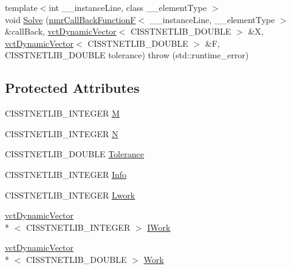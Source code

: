 {\bf }\par
\begin{DoxyCompactItemize}
\item 
{\footnotesize template$<$int \-\_\-\-\_\-instance\-Line, class \-\_\-\-\_\-element\-Type $>$ }\\void \hyperlink{classnmr_l_s_non_lin_solver_a79af0b924ff834cf31df5e20ae261c59}{Solve} (\hyperlink{classnmr_call_back_function_f}{nmr\-Call\-Back\-Function\-F}$<$ \-\_\-\-\_\-instance\-Line, \-\_\-\-\_\-element\-Type $>$ \&call\-Back, \hyperlink{classvct_dynamic_vector}{vct\-Dynamic\-Vector}$<$ C\-I\-S\-S\-T\-N\-E\-T\-L\-I\-B\-\_\-\-D\-O\-U\-B\-L\-E $>$ \&X, \hyperlink{classvct_dynamic_vector}{vct\-Dynamic\-Vector}$<$ C\-I\-S\-S\-T\-N\-E\-T\-L\-I\-B\-\_\-\-D\-O\-U\-B\-L\-E $>$ \&F, C\-I\-S\-S\-T\-N\-E\-T\-L\-I\-B\-\_\-\-D\-O\-U\-B\-L\-E tolerance)  throw (std\-::runtime\-\_\-error)
\end{DoxyCompactItemize}

\subsection*{Protected Attributes}
\begin{DoxyCompactItemize}
\item 
C\-I\-S\-S\-T\-N\-E\-T\-L\-I\-B\-\_\-\-I\-N\-T\-E\-G\-E\-R \hyperlink{classnmr_l_s_non_lin_solver_ae149f93166d678e971025b9c515426a5}{M}
\item 
C\-I\-S\-S\-T\-N\-E\-T\-L\-I\-B\-\_\-\-I\-N\-T\-E\-G\-E\-R \hyperlink{classnmr_l_s_non_lin_solver_a5ee3cc88525a1b1f9749729b676135fe}{N}
\item 
C\-I\-S\-S\-T\-N\-E\-T\-L\-I\-B\-\_\-\-D\-O\-U\-B\-L\-E \hyperlink{classnmr_l_s_non_lin_solver_a4becb9d9f32e92e2bd373a353ddb7b81}{Tolerance}
\item 
C\-I\-S\-S\-T\-N\-E\-T\-L\-I\-B\-\_\-\-I\-N\-T\-E\-G\-E\-R \hyperlink{classnmr_l_s_non_lin_solver_a592efff84d1cb170d3669b9f968db99b}{Info}
\item 
C\-I\-S\-S\-T\-N\-E\-T\-L\-I\-B\-\_\-\-I\-N\-T\-E\-G\-E\-R \hyperlink{classnmr_l_s_non_lin_solver_a987d725eb629e7f092797e58caac9b73}{Lwork}
\item 
\hyperlink{classvct_dynamic_vector}{vct\-Dynamic\-Vector}\\*
$<$ C\-I\-S\-S\-T\-N\-E\-T\-L\-I\-B\-\_\-\-I\-N\-T\-E\-G\-E\-R $>$ \hyperlink{classnmr_l_s_non_lin_solver_a0c563e7168d837d88c9ecfe256bd4c16}{I\-Work}
\item 
\hyperlink{classvct_dynamic_vector}{vct\-Dynamic\-Vector}\\*
$<$ C\-I\-S\-S\-T\-N\-E\-T\-L\-I\-B\-\_\-\-D\-O\-U\-B\-L\-E $>$ \hyperlink{classnmr_l_s_non_lin_solver_a7ba55974c126ea40c19938c09c6ac730}{Work}
\end{DoxyCompactItemize}


